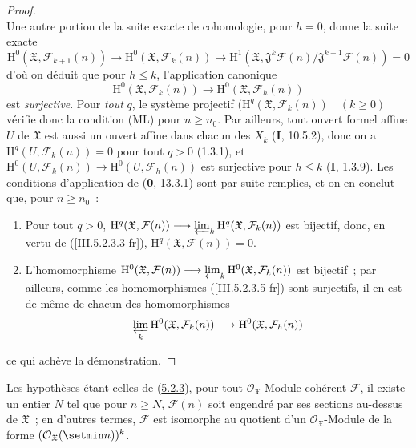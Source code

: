 \begin{proof}
\begin{equation}
\end{equation}
Une autre portion de la suite exacte de cohomologie, pour $h=0$, donne la suite
exacte
\begin{equation}
\mathrm H^0(\mathfrak X,\mathcal F_{k+1}(n))\to
\mathrm H^0(\mathfrak X,\mathcal F_k(n))\to
\mathrm H^1(\mathfrak X,
\mathfrak J^k\mathcal F(n)/\mathfrak J^{k+1}\mathcal F(n))=0
\tag{5.2.3.4}
\label{III.5.2.3.4-fr}
\end{equation}
d'où on déduit que pour $h\leq k$, l'application canonique
\begin{equation}
\mathrm H^0(\mathfrak X,\mathcal F_k(n))\longrightarrow
\mathrm H^0(\mathfrak X,\mathcal F_h(n))
\tag{5.2.3.5}
\label{III.5.2.3.5-fr}
\end{equation}
est \emph{surjective}. Pour \emph{tout} $q$, le système projectif
$(\mathrm H^q(\mathfrak X,\mathcal F_k(n))\quad(k\geq0)$ vérifie donc la condition
(ML) pour $n\geq n_0$. Par ailleurs, tout ouvert formel affine $U$ de $\mathfrak X$
est aussi un ouvert affine dans chacun des $X_k$ (\textbf{I}, 10.5.2), donc on a
$\mathrm H^q(U,\mathcal F_k(n))=0$ pour tout $q>0$ (1.3.1), et
$\mathrm H^0(U,\mathcal F_k(n))\to\mathrm H^0(U,\mathcal F_h(n))$ est surjective
pour $h\leq k$ (\textbf{I}, 1.3.9). Les conditions d'application de (\textbf{0}, 13.3.1) sont par
suite remplies, et on en conclut que, pour $n\geq n_0$~:
\begin{enumerate}
\item[$1^\circ$] Pour tout $q>0$,
$\mathrm H^q(\mathfrak X,\mathcal F(n))\longrightarrow
\varprojlim_k\mathrm H^q(\mathfrak X,\mathcal F_k(n))$
est bijectif, donc, en vertu de (\ref{III.5.2.3.3-fr}),
$\mathrm H^q(\mathfrak X,\mathcal F(n))=0$.
\item[$2^\circ$] L'homomorphisme
$\mathrm H^0(\mathfrak X,\mathcal F(n))\longrightarrow
\varprojlim_k\mathrm H^0(\mathfrak X,\mathcal F_k(n))$
est bijectif~; par ailleurs, comme les homomorphismes
(\ref{III.5.2.3.5-fr}) sont surjectifs, il en est de même de chacun des
homomorphismes
\[
\varprojlim_k\mathrm H^0(\mathfrak X,\mathcal F_k(n))
\longrightarrow\mathrm H^0(\mathfrak X,\mathcal F_h(n))
\]
\end{enumerate}
ce qui achève la démonstration.
\end{proof}

\begin{corollary}[5.2.4]
\label{III.5.2.4-fr}
Les hypothèses étant celles de \textup{(\hyperref[III.5.2.3-fr]{5.2.3})}, pour tout
$\mathcal O_{\mathfrak X}$-Module cohérent $\mathcal F$, il existe un entier $N$
tel que pour $n\geq N$, $\mathcal F(n)$ soit engendré par ses sections au-dessus
de $\mathfrak X$~; en d'autres termes, $\mathcal F$ est isomorphe au quotient d'un
$\mathcal O_{\mathfrak X}$-Module de la forme
$(\mathcal O_{\mathfrak X}(\setmin n))^k$.
\end{corollary}

